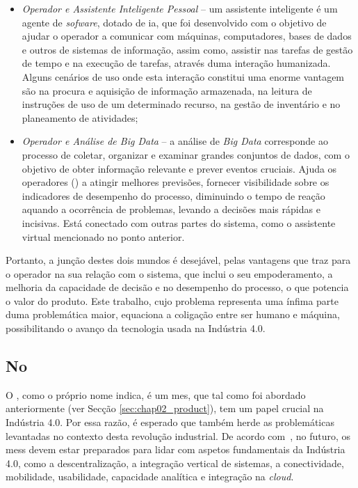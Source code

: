 \begin{itemize}
    \item
    {
        \textit{Operador e Assistente Inteligente Pessoal} -- um assistente inteligente é um agente de \textit{sofware}, dotado de \gls{ia}, que foi desenvolvido com o objetivo de ajudar o operador a comunicar com máquinas, computadores, bases de dados e outros de sistemas de informação, assim como, assistir nas tarefas de gestão de tempo e na execução de tarefas, através duma interação humanizada. Alguns cenários de uso onde esta interação constitui uma enorme vantagem são na procura e aquisição de informação armazenada, na leitura de instruções de uso de um determinado recurso, na gestão de inventário e no planeamento de atividades;
    }
    \item
    {
        \textit{Operador e Análise de Big Data} -- a análise de \textit{Big Data} corresponde ao processo de coletar, organizar e examinar grandes conjuntos de dados, com o objetivo de obter informação relevante e prever eventos cruciais. Ajuda os operadores () a atingir melhores previsões, fornecer visibilidade sobre os indicadores de desempenho do processo, diminuindo o tempo de reação aquando a ocorrência de problemas, levando a decisões mais rápidas e incisivas. Está conectado com outras partes do sistema, como o assistente virtual mencionado no ponto anterior.
    }
\end{itemize}

Portanto, a junção destes dois mundos é desejável, pelas vantagens que traz para o operador na sua relação com o sistema, que inclui o seu empoderamento, a melhoria da capacidade de decisão e no desempenho do processo, o que potencia o valor do produto. Este trabalho, cujo problema representa uma ínfima parte duma problemática maior, equaciona a coligação entre ser humano e máquina, possibilitando o avanço da tecnologia usada na Indústria 4.0.

\subsection{No {\productname}}
O {\productname}, como o próprio nome indica, é um \gls{mes}, que tal como foi abordado anteriormente (ver Secção \ref{sec:chap02_product}), tem um papel crucial na Indústria 4.0. Por essa razão, é esperado que também herde as problemáticas levantadas no contexto desta revolução industrial. De acordo com~\textcite{industry40_revolution_future_mes}, no futuro, os \glspl{mes} devem estar preparados para lidar com aspetos fundamentais da Indústria 4.0, como a descentralização, a integração vertical de sistemas, a conectividade, mobilidade, usabilidade, capacidade analítica e integração na \textit{cloud}. 

